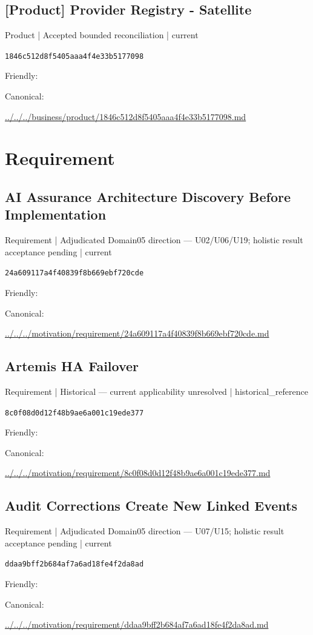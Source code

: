\documentclass[10pt,a4paper]{article}
\begin{document}
\subsection*{[Product] Provider Registry - Satellite}
{\small Product | Accepted bounded reconciliation | current}\par
\texttt{1846c512d8f5405aaa4f4e33b5177098}\par
Friendly: \par
Canonical: \par
{\footnotesize\url{../../../business/product/1846c512d8f5405aaa4f4e33b5177098.md}}\par
\section*{Requirement}
\subsection*{AI Assurance Architecture Discovery Before Implementation}
{\small Requirement | Adjudicated Domain05 direction — U02/U06/U19; holistic result acceptance pending | current}\par
\texttt{24a609117a4f40839f8b669ebf720cde}\par
Friendly: \par
Canonical: \par
{\footnotesize\url{../../../motivation/requirement/24a609117a4f40839f8b669ebf720cde.md}}\par
\subsection*{Artemis HA Failover}
{\small Requirement | Historical — current applicability unresolved | historical\_reference}\par
\texttt{8c0f08d0d12f48b9ae6a001c19ede377}\par
Friendly: \par
Canonical: \par
{\footnotesize\url{../../../motivation/requirement/8c0f08d0d12f48b9ae6a001c19ede377.md}}\par
\subsection*{Audit Corrections Create New Linked Events}
{\small Requirement | Adjudicated Domain05 direction — U07/U15; holistic result acceptance pending | current}\par
\texttt{ddaa9bff2b684af7a6ad18fe4f2da8ad}\par
Friendly: \par
Canonical: \par
{\footnotesize\url{../../../motivation/requirement/ddaa9bff2b684af7a6ad18fe4f2da8ad.md}}\par
\end{document}
